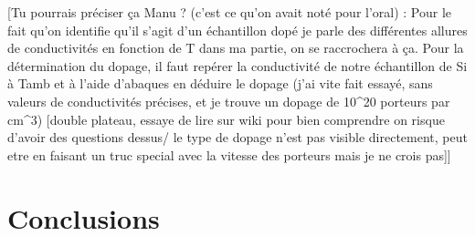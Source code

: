 [Tu pourrais préciser ça Manu ? (c'est ce qu'on avait noté pour l'oral) : 
Pour le fait qu'on identifie qu'il s'agit d'un échantillon dopé je parle des différentes allures de conductivités en fonction de T dans ma partie, on se raccrochera à ça.
Pour la détermination du dopage, il faut repérer la conductivité de notre échantillon de Si à Tamb et à l'aide d'abaques en déduire le dopage (j'ai vite fait essayé, sans valeurs de conductivités précises, et je trouve un dopage de 10^20 porteurs par cm^3)
    [double plateau, essaye de lire sur wiki pour bien comprendre on risque d'avoir des questions dessus/ le type de dopage n'est pas visible directement, peut etre en faisant un truc special avec la vitesse des porteurs mais je ne crois pas]]


\section*{Conclusions}

